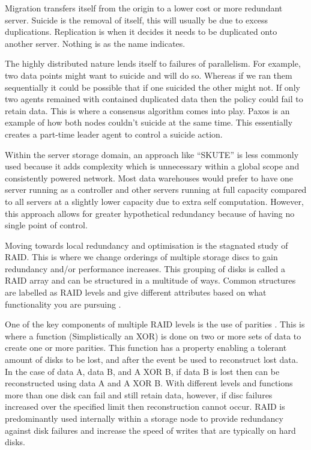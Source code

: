 \documentclass{UoYCSproject}
\begin{document}
Migration transfers itself from the origin to a lower cost or more redundant server.
Suicide is the removal of itself, this will usually be due to excess duplications.
Replication is when it decides it needs to be duplicated onto another server.
Nothing is as the name indicates.

The highly distributed nature lends itself to failures of parallelism.
For example, two data points might want to suicide and will do so.
Whereas if we ran them sequentially it could be possible that if one suicided the other might not.
If only two agents remained with contained duplicated data then the policy could fail to retain data.
This is where a consensus algorithm comes into play.
Paxos \cite{Paxos} is an example of how both nodes couldn’t suicide at the same time.
This essentially creates a part-time leader agent to control a suicide action.

Within the server storage domain, an approach like “SKUTE” is less commonly used because it adds complexity which is unnecessary within a global scope and consistently powered network.
Most data warehouses would prefer to have one server running as a controller and other servers running at full capacity compared to all servers at a slightly lower capacity due to extra self computation.
However, this approach allows for greater hypothetical redundancy because of having no single point of control.

Moving towards local redundancy and optimisation is the stagnated study of RAID.
This is where we change orderings of multiple storage discs to gain redundancy and/or performance increases.
This grouping of disks is called a RAID array and can be structured in a multitude of ways.
Common structures are labelled as RAID levels and give different attributes based on what functionality you are pursuing \cite{RAID levels}.

One of the key components of multiple RAID levels is the use of parities \cite{Raid parity}.
This is where a function (Simplistically an XOR) is done on two or more sets of data to create one or more parities.
This function has a property enabling a tolerant amount of disks to be lost, and after the event be used to reconstruct lost data.
In the case of data A, data B, and A XOR B, if data B is lost then can be reconstructed using data A and A XOR B.
With different levels and functions more than one disk can fail and still retain data, however, if disc failures increased over the specified limit then reconstruction cannot occur.
RAID is predominantly used internally within a storage node to provide redundancy against disk failures and increase the speed of writes that are typically on hard disks.
\end{document}
